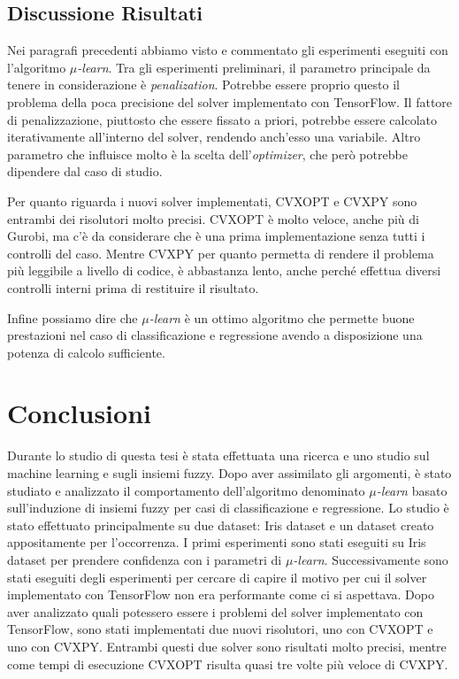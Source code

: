 \documentclass[a4paper,12pt]{report}
\begin{document}
\section{Discussione Risultati}
Nei paragrafi precedenti abbiamo visto e commentato gli esperimenti eseguiti con l'algoritmo \textit{$\mu$-learn}. Tra gli esperimenti preliminari, il parametro principale da tenere in considerazione è \textit{penalization}. Potrebbe essere proprio questo il problema della poca precisione del solver implementato con TensorFlow. Il fattore di penalizzazione, piuttosto che essere fissato a priori, potrebbe essere calcolato iterativamente all'interno del solver, rendendo anch'esso una variabile. Altro parametro che influisce molto è la scelta dell'\textit{optimizer}, che però potrebbe dipendere dal caso di studio. 

Per quanto riguarda i nuovi solver implementati, CVXOPT e CVXPY sono entrambi dei risolutori molto precisi. CVXOPT è molto veloce, anche più di Gurobi, ma c'è da considerare che è una prima implementazione senza tutti i controlli del caso. Mentre CVXPY per quanto permetta di rendere il problema più leggibile a livello di codice, è abbastanza lento, anche perché effettua diversi controlli interni prima di restituire il risultato.

Infine possiamo dire che \textit{$\mu$-learn} è un ottimo algoritmo che permette buone prestazioni nel caso di classificazione e regressione avendo a disposizione una potenza di calcolo sufficiente.




\chapter*{Conclusioni}
\label{Conclusioni}
Durante lo studio di questa tesi è stata effettuata una ricerca e uno studio sul machine learning e sugli insiemi fuzzy.
Dopo aver assimilato gli argomenti, è stato studiato e analizzato il comportamento dell'algoritmo denominato \textit{$\mu$-learn} basato sull'induzione di insiemi fuzzy per casi di classificazione e regressione. Lo studio è stato effettuato principalmente su due dataset: Iris dataset e un dataset creato appositamente per l'occorrenza. I primi esperimenti sono stati eseguiti su Iris dataset per prendere confidenza con i parametri di \textit{$\mu$-learn}. Successivamente sono stati eseguiti degli esperimenti per cercare di capire il motivo per cui il solver implementato con TensorFlow non era performante come ci si aspettava. Dopo aver analizzato quali potessero essere i problemi del solver implementato con TensorFlow, sono stati implementati due nuovi risolutori, uno con CVXOPT e uno con CVXPY. Entrambi questi due solver sono risultati molto precisi, mentre come tempi di esecuzione CVXOPT risulta quasi tre volte più veloce di CVXPY.
\end{document}
